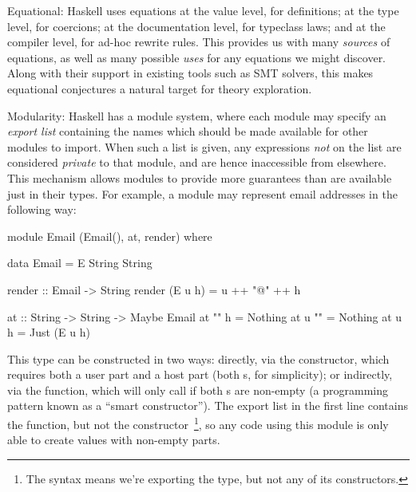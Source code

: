 \begin{description}
\item{Equational}: Haskell uses equations at the value level, for definitions;
  at the type level, for coercions; at the documentation level, for typeclass
  laws; and at the compiler level, for ad-hoc rewrite rules. This provides us
  with many \emph{sources} of equations, as well as many possible \emph{uses}
  for any equations we might discover. Along with their support in existing
  tools such as SMT solvers, this makes equational conjectures a natural target
  for theory exploration.

\item{Modularity}: Haskell has a module system, where each module may specify an
  \emph{export list} containing the names which should be made available for
  other modules to import. When such a list is given, any expressions \emph{not}
  on the list are considered \emph{private} to that module, and are hence
  inaccessible from elsewhere. This mechanism allows modules to provide more
  guarantees than are available just in their types. For example, a module may
  represent email addresses in the following way:

  \begin{haskell}
    module Email (Email(), at, render) where

    data Email = E String String

    render :: Email -> String
    render (E u h) = u ++ "@" ++ h

    at :: String -> String -> Maybe Email
    at "" h  = Nothing
    at u  "" = Nothing
    at u  h  = Just (E u h)
  \end{haskell}

  This  type can be constructed in two ways: directly, via the 
  constructor, which requires both a user part and a host part (both
  s, for simplicity); or indirectly, via the  function, which
  will only call  if both s are non-empty (a programming
  pattern known as a ``smart constructor''). The export list in the first line
  contains the  function, but not the  constructor~\footnote{The
    syntax  means we're exporting the  type, but not any
    of its constructors.}, so any code using this module is only able to create
   values with non-empty parts.

\end{description}


